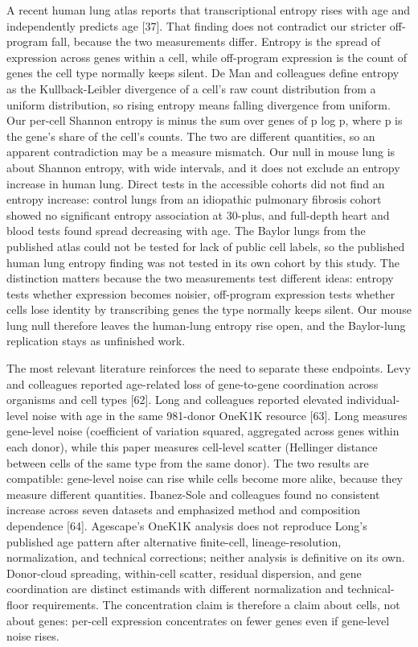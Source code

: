 \documentclass[11pt]{article}
\begin{document}
A recent human lung atlas reports that transcriptional entropy rises with age and independently predicts age [37]. That finding does not contradict our stricter off-program fall, because the two measurements differ. Entropy is the spread of expression across genes within a cell, while off-program expression is the count of genes the cell type normally keeps silent. De Man and colleagues define entropy as the Kullback-Leibler divergence of a cell's raw count distribution from a uniform distribution, so rising entropy means falling divergence from uniform. Our per-cell Shannon entropy is minus the sum over genes of p log p, where p is the gene's share of the cell's counts. The two are different quantities, so an apparent contradiction may be a measure mismatch. Our null in mouse lung is about Shannon entropy, with wide intervals, and it does not exclude an entropy increase in human lung. Direct tests in the accessible cohorts did not find an entropy increase: control lungs from an idiopathic pulmonary fibrosis cohort showed no significant entropy association at 30-plus, and full-depth heart and blood tests found spread decreasing with age. The Baylor lungs from the published atlas could not be tested for lack of public cell labels, so the published human lung entropy finding was not tested in its own cohort by this study. The distinction matters because the two measurements test different ideas: entropy tests whether expression becomes noisier, off-program expression tests whether cells lose identity by transcribing genes the type normally keeps silent. Our mouse lung null therefore leaves the human-lung entropy rise open, and the Baylor-lung replication stays as unfinished work.

The most relevant literature reinforces the need to separate these endpoints. Levy and colleagues reported age-related loss of gene-to-gene coordination across organisms and cell types [62]. Long and colleagues reported elevated individual-level noise with age in the same 981-donor OneK1K resource [63]. Long measures gene-level noise (coefficient of variation squared, aggregated across genes within each donor), while this paper measures cell-level scatter (Hellinger distance between cells of the same type from the same donor). The two results are compatible: gene-level noise can rise while cells become more alike, because they measure different quantities. Ibanez-Sole and colleagues found no consistent increase across seven datasets and emphasized method and composition dependence [64]. Agescape's OneK1K analysis does not reproduce Long's published age pattern after alternative finite-cell, lineage-resolution, normalization, and technical corrections; neither analysis is definitive on its own. Donor-cloud spreading, within-cell scatter, residual dispersion, and gene coordination are distinct estimands with different normalization and technical-floor requirements. The concentration claim is therefore a claim about cells, not about genes: per-cell expression concentrates on fewer genes even if gene-level noise rises.
\end{document}

